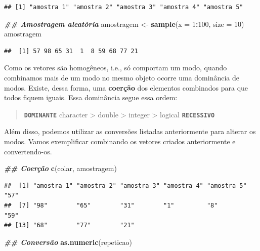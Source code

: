 \documentclass[
]{article}
\newenvironment{Shaded}{\begin{snugshade}}{\end{snugshade}}
\newcommand{\AttributeTok}[1]{\textcolor[rgb]{0.13,0.29,0.53}{#1}}
\newcommand{\DecValTok}[1]{\textcolor[rgb]{0.00,0.00,0.81}{#1}}
\newcommand{\DocumentationTok}[1]{\textcolor[rgb]{0.56,0.35,0.01}{\textbf{\textit{#1}}}}
\newcommand{\FunctionTok}[1]{\textcolor[rgb]{0.13,0.29,0.53}{\textbf{#1}}}
\newcommand{\NormalTok}[1]{#1}
\newcommand{\OtherTok}[1]{\textcolor[rgb]{0.56,0.35,0.01}{#1}}
\newcommand{\SpecialCharTok}[1]{\textcolor[rgb]{0.81,0.36,0.00}{\textbf{#1}}}
\begin{document}
\begin{verbatim}
## [1] "amostra 1" "amostra 2" "amostra 3" "amostra 4" "amostra 5"
\end{verbatim}

\begin{Shaded}
\begin{Highlighting}[]
\DocumentationTok{\#\# Amostragem aleatória}
\NormalTok{amostragem }\OtherTok{\textless{}{-}} \FunctionTok{sample}\NormalTok{(}\AttributeTok{x =} \DecValTok{1}\SpecialCharTok{:}\DecValTok{100}\NormalTok{, }\AttributeTok{size =} \DecValTok{10}\NormalTok{)}
\NormalTok{amostragem}
\end{Highlighting}
\end{Shaded}

\begin{verbatim}
##  [1] 57 98 65 31  1  8 59 68 77 21
\end{verbatim}

Como os vetores são homogêneos, i.e., só comportam um modo, quando combinamos mais de um modo no mesmo objeto ocorre uma dominância de modos. Existe, dessa forma, uma \textbf{coerção} dos elementos combinados para que todos fiquem iguais. Essa dominância segue essa ordem:

\begin{quote}
\textbf{\texttt{DOMINANTE}} character \textgreater{} double \textgreater{} integer \textgreater{} logical \textbf{\texttt{RECESSIVO}}
\end{quote}

Além disso, podemos utilizar as conversões listadas anteriormente para alterar os modos. Vamos exemplificar combinando os vetores criados anteriormente e convertendo-os.

\begin{Shaded}
\begin{Highlighting}[]
\DocumentationTok{\#\# Coerção}
\FunctionTok{c}\NormalTok{(colar, amostragem)}
\end{Highlighting}
\end{Shaded}

\begin{verbatim}
##  [1] "amostra 1" "amostra 2" "amostra 3" "amostra 4" "amostra 5" "57"       
##  [7] "98"        "65"        "31"        "1"         "8"         "59"       
## [13] "68"        "77"        "21"
\end{verbatim}

\begin{Shaded}
\begin{Highlighting}[]
\DocumentationTok{\#\# Conversão}
\FunctionTok{as.numeric}\NormalTok{(repeticao)}
\end{Highlighting}
\end{Shaded}
\end{document}
